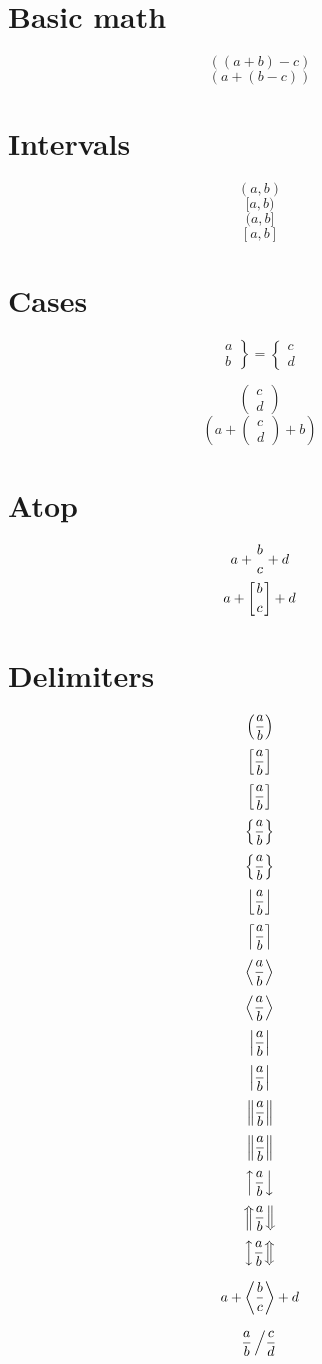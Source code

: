 \documentclass{article}
\begin{document}
%
%
%
%
%

\section{Basic math}
\[ ((a + b) - c) \]
\[ (a + (b - c)) \]

\section{Intervals}
\[ (a,b) \]
\[ [a,b) \]
\[ (a,b] \]
\[ [a,b] \]

\section{Cases}

\[ \left.\begin{array}{l} a \\ b \end{array}\right\}
  = \left\{\begin{array}{l} c\\ d\end{array}\right. \]

\[ \left(\begin{array}{l} c\\ d\end{array}\right) \]
\[ (a + \left(\begin{array}{l} c\\ d\end{array}\right) + b) \]

\section{Atop}
\[ a + { b \atop c } + d \]
\[ a + \left[ b \atop c \right] + d \]


\section{Delimiters}
\[ \left( {a \over b} \right) \]
\[ \left[ {a \over b} \right] \]
\[ \left\lbrack {a \over b} \right\rbrack \]
\[ \left\{ {a \over b} \right\} \]
\[ \left\lbrace {a \over b} \right\rbrace \]
\[ \left\lfloor {a \over b} \right\rfloor \]
\[ \left\lceil {a \over b} \right\rceil \]
\[ \left< {a \over b} \right> \]
\[ \left\langle {a \over b} \right\rangle \]
\[ \left| {a \over b} \right| \]
\[ \left\vert {a \over b} \right\vert \]
\[ \left\| {a \over b} \right\| \]
\[ \left\Vert {a \over b} \right\Vert \]
\[ \left\uparrow {a \over b} \right\downarrow \]
\[ \left\Uparrow {a \over b} \right\Downarrow \]
\[ \left\updownarrow {a \over b} \right\Updownarrow \]

\def\foo{\langle}
\def\bar{\rangle}
\[ a + \left\foo {b \over c} \right\bar + d \]

\[ {a \over b} \left/ {c \over d} \right. \]
\end{document}
